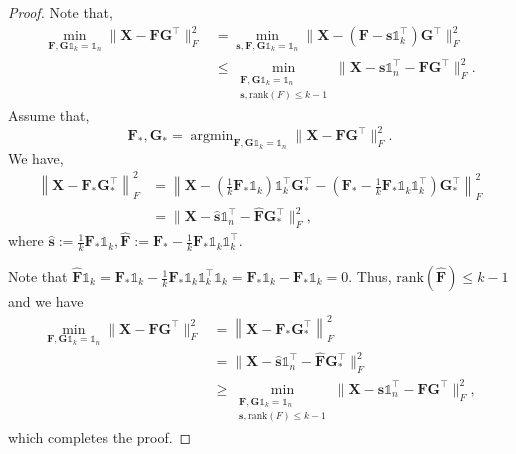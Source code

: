 \documentclass[journal]{IEEEtran}
\begin{document}
\begin{proof}
	Note that,
	\[
	\begin{aligned}
	\min_{\mathbf{F},\mathbf{G}\mathbb{1}_k = \mathbb{1}_n} \| \mathbf{X} - \mathbf{FG}^\top\|_F^2 
	&=
	\min_{\mathbf{s}, \mathbf{F},\mathbf{G}\mathbb{1}_k = \mathbb{1}_n} \| \mathbf{X} - \left( \mathbf{F}- \mathbf{s}\mathbb{1}_k^\top \right)\mathbf{G}^\top\|_F^2\\
	&\leq
	\min_{\substack{\mathbf{F},\mathbf{G}\mathbb{1}_k = \mathbb{1}_n \\ \mathbf{s}, \text{rank}(F) \leq k-1 }} \| \mathbf{X} - \mathbf{s}\mathbb{1}_n^\top- \mathbf{FG}^\top\|_F^2.
	\end{aligned}
	\]
	Assume that,
	\[
	\mathbf{F}_*, \mathbf{G}_* = \mathop{\arg\min}_{\mathbf{F},\mathbf{G}\mathbb{1}_k = \mathbb{1}_n}\| \mathbf{X} - \mathbf{FG}^\top\|_F^2.
	\]
	We have,
	\[
	\begin{aligned}
	\left\|\mathbf{X} - \mathbf{F}_*\mathbf{G}_*^\top\right\|_F^2
	&=
	\left\|\mathbf{X} - \left(\frac{1}{k}\mathbf{F}_*\mathbb{1}_k\right)\mathbb{1}_k^\top \mathbf{G}_*^\top - \left(\mathbf{F}_* - \frac{1}{k}\mathbf{F}_*\mathbb{1}_k\mathbb{1}_k^\top \right)\mathbf{G}_*^\top  \right\|_F^2\\
	&=\|\mathbf{X} - \hat{\mathbf{s}}\mathbb{1}_n^\top - \hat{\mathbf{F}}\mathbf{G}_*^\top  \|_F^2,
	\end{aligned}
	\]
	where $\hat{\mathbf{s}} := \frac{1}{k}\mathbf{F}_*\mathbb{1}_k, \hat{\mathbf{F}} := \mathbf{F}_* - \frac{1}{k}\mathbf{F}_*\mathbb{1}_k\mathbb{1}_k^\top$. 
	
	Note that $\hat{\mathbf{F}} \mathbb{1}_k = \mathbf{F}_*\mathbb{1}_k - \frac{1}{k}\mathbf{F}_*\mathbb{1}_k\mathbb{1}_k^\top\mathbb{1}_k
	=\mathbf{F}_*\mathbb{1}_k-\mathbf{F}_*\mathbb{1}_k=0$. Thus, $\text{rank}(\hat{\mathbf{F}}) \leq k-1$ and we have
	\[
	\begin{aligned}
	\min_{\mathbf{F},\mathbf{G}\mathbb{1}_k = \mathbb{1}_n} \| \mathbf{X} - \mathbf{FG}^\top\|_F^2 
	&=
	\left\|\mathbf{X} - \mathbf{F}_*\mathbf{G}_*^\top\right\|_F^2\\
	&=\|\mathbf{X} - \hat{\mathbf{s}}\mathbb{1}_n^\top - \hat{\mathbf{F}}\mathbf{G}_*^\top  \|_F^2\\
	&\geq\min_{\substack{\mathbf{F},\mathbf{G}\mathbb{1}_k = \mathbb{1}_n \\ \mathbf{s}, \text{rank}(F) \leq k-1 }} \| \mathbf{X} - \mathbf{s}\mathbb{1}_n^\top- \mathbf{FG}^\top\|_F^2,
	\end{aligned}
	\]
	which completes the proof.
\end{proof}
\end{document}
